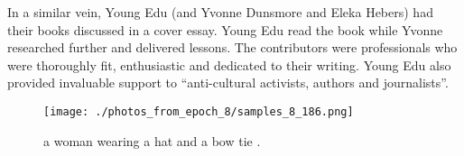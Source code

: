\documentclass{article}%
\begin{document}
In a similar vein, Young Edu (and Yvonne Dunsmore and Eleka Hebers) had their books discussed in a cover essay. Young Edu read the book while Yvonne researched further and delivered lessons. The contributors were professionals who were thoroughly fit, enthusiastic and dedicated to their writing. Young Edu also provided invaluable support to “anti{-}cultural activists, authors and journalists”.\newline%

%


\begin{figure}[h!]%
\centering%
\texttt{[image: ./photos\_from\_epoch\_8/samples\_8\_186.png]}%
\caption{a woman wearing a hat and a bow tie .}%
\end{figure}

%
\end{document}
